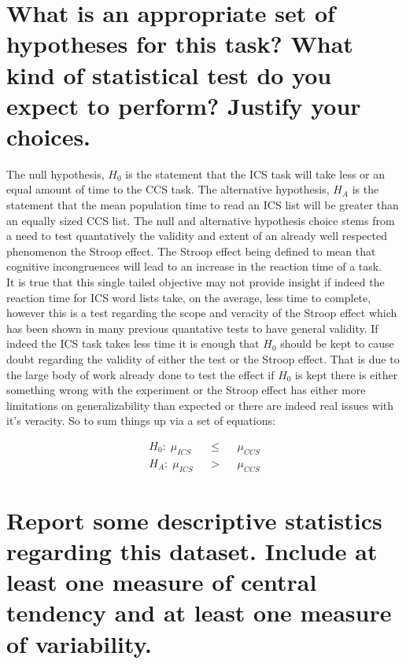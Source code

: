 \documentclass{article}
\begin{document}
    \section{What is an appropriate set of hypotheses for this task? What
kind of statistical test do you expect to perform? Justify your
choices.}\label{what-is-an-appropriate-set-of-hypotheses-for-this-task-what-kind-of-statistical-test-do-you-expect-to-perform-justify-your-choices.}

    The null hypothesis, \(H_0\) is the statement that the ICS task will
take less or an equal amount of time to the CCS task. The alternative
hypothesis, \(H_A\) is the statement that the mean population time to
read an ICS list will be greater than an equally sized CCS list. The
null and alternative hypothesis choice stems from a need to test
quantatively the validity and extent of an already well respected
phenomenon the Stroop effect. The Stroop effect being defined to mean
that cognitive incongruences will lead to an increase in the reaction
time of a task.\\ It is true that this single tailed objective may not
provide insight if indeed the reaction time for ICS word lists take, on
the average, less time to complete, however this is a test regarding the
scope and veracity of the Stroop effect which has been shown in many
previous quantative tests to have general validity. If indeed the ICS
task takes less time it is enough that \(H_0\) should be kept to cause
doubt regarding the validity of either the test or the Stroop effect.
That is due to the large body of work already done to test the effect if
\(H_0\) is kept there is either something wrong with the experiment or
the Stroop effect has either more limitations on generalizability than
expected or there are indeed real issues with it's veracity. So to sum
things up via a set of equations:

\begin{align}
H_0:\; \mu_{ICS} &&\le&& \mu_{CCS} \\
H_A:\; \mu_{ICS} &&>&& \mu_{CCS}
\end{align}

    \section{Report some descriptive statistics regarding this dataset.
Include at least one measure of central tendency and at least one
measure of
variability.}\label{report-some-descriptive-statistics-regarding-this-dataset.-include-at-least-one-measure-of-central-tendency-and-at-least-one-measure-of-variability.}
\end{document}
